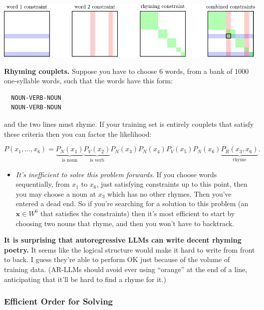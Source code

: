\documentclass[
  11pt,
  letterpaper,
  DIV=11,
  numbers=noendperiod,
  oneside]{scrartcl}
\providecommand{\tightlist}{%
  \setlength{\itemsep}{0pt}\setlength{\parskip}{0pt}}\usepackage{longtable,booktabs,array}
\newcommand{\ut}[2]{\underbrace{#1}_{\text{#2}}}
\begin{document}
\includegraphics{2022-04-11-ml-ai-synthesis-generative_files/figure-pdf/unnamed-chunk-1-1.pdf}

\textbf{Rhyming couplets.} Suppose you have to choose 6 words, from a
bank of 1000 one-syllable words, such that the words have this form:

\begin{verbatim}
  NOUN-VERB-NOUN
  NOUN-VERB-NOUN
\end{verbatim}

and the two lines must rhyme. If your training set is entirely couplets
that satisfy these criteria then you can factor the likelihood:

\[P(x_1,\ldots,x_6)=\ut{P_N(x_1)}{is noun}\ut{P_V(x_2)}{is verb}P_N(x_3)
      P_N(x_4)P_V(x_5)P_N(x_6)\ut{P_R(x_3,x_6)}{rhyme}.
\]

\begin{itemize}
\tightlist
\item
  \emph{It's inefficient to solve this problem forwards.} If you choose
  words sequentially, from \(x_1\) to \(x_6\), just satisfying
  constraints up to this point, then you may choose a noun at \(x_3\)
  which has no other rhymes. Then you've entered a dead end. So if
  you're searching for a solution to this problem (an \(\bm{x}\in W^6\)
  that satisfies the constraints) then it's most efficient to start by
  choosing two nouns that rhyme, and then you won't have to backtrack.
\end{itemize}

\textbf{It is surprising that autoregressive LLMs can write decent
rhyming poetry.} It seems like the logical structure would make it hard
to write from front to back. I guess they're able to perform OK just
because of the volume of training data. (AR-LLMs should avoid ever using
``orange'' at the end of a line, anticipating that it'll be hard to find
a rhyme for it.)

\hypertarget{efficient-order-for-solving}{%
\subsubsection{Efficient Order for
Solving}\label{efficient-order-for-solving}}
\end{document}
